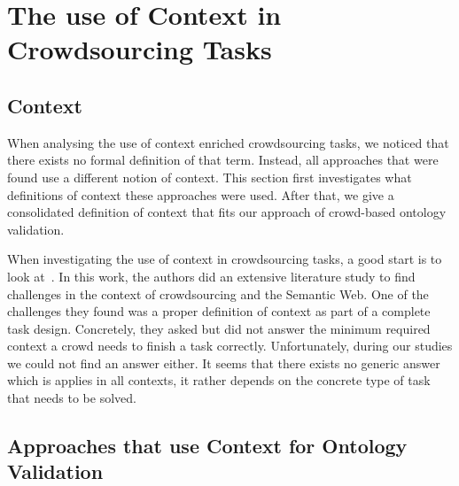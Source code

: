 \section{The use of Context in Crowdsourcing Tasks}
% 

\subsection{Context}
When analysing the use of context enriched crowdsourcing tasks, we noticed that there exists no formal definition of that term. Instead, all approaches that were found use a different notion of context. 
This section first investigates what definitions of context these approaches were used. After that, we give a consolidated definition of context that fits our approach of crowd-based ontology validation.

When investigating the use of context in crowdsourcing tasks, a good start is to look at~\cite{sarasua2015crowdsourcing}. In this work, the authors did an extensive literature study to find challenges in the context of crowdsourcing and the Semantic Web. One of the challenges they found was a proper definition of context as part of a complete task design. Concretely, they asked but did not answer the minimum required context a crowd needs to finish a task correctly. Unfortunately, during our studies we could not find an answer either. It seems that there exists no generic answer which is applies in all contexts, it rather depends on the concrete type of task that needs to be solved. 


\subsection{Approaches that use Context for Ontology Validation}
